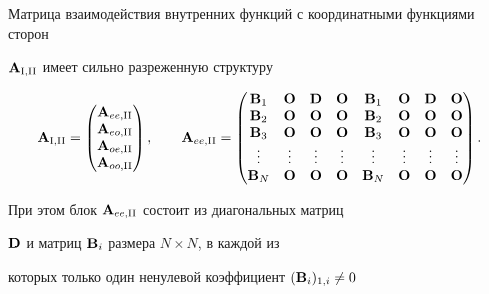 Матрица взаимодействия внутренних функций с координатными функциями сторон 


${\bold A}_{{\mathrm{I}},{\mathrm{II}}}$ имеет сильно разреженную структуру


\begin{equation*}




{\bold A}_{\ri,\rii}=


\begin{pmatrix}


{\bold A}_{ee,\rii} \\ {\bold A }_{eo,\rii} \\


{\bold A }_{oe,\rii} \\ {\bold A }_{oo,\rii}


\end{pmatrix}


,\qquad


{\bold A}_{ee,\rii} =


\begin{pmatrix}


{\bold B}_1 & {\bold O} & {\bold D} & {\bold O} & {\bold B}_1 &


{\bold O} & {\bold D} & {\bold O} \\


{\bold B}_2 & {\bold O} & {\bold O} & {\bold O} & {\bold B}_2 &


{\bold O} & {\bold O} & {\bold O} \\


{\bold B}_3 & {\bold O} & {\bold O} & {\bold O} & {\bold B}_3 &


{\bold O} & {\bold O} & {\bold O} \\


\vdots & \vdots & \vdots & \vdots & \vdots & \vdots & \vdots & \vdots \\


{\bold B}_N & {\bold O} & {\bold O} & {\bold O} & {\bold B}_N &


{\bold O} & {\bold O} & {\bold O}


\end{pmatrix}.


\end{equation*}


При этом блок ${\bold A}_{ee,{\mathrm{II}}}$ состоит из диагональных матриц


$\bold D$ и матриц ${\bold B}_i$ размера $N\times N $, в каждой из


которых только один ненулевой коэффициент $({\bold B}_i)_{1,i}\ne 0$


